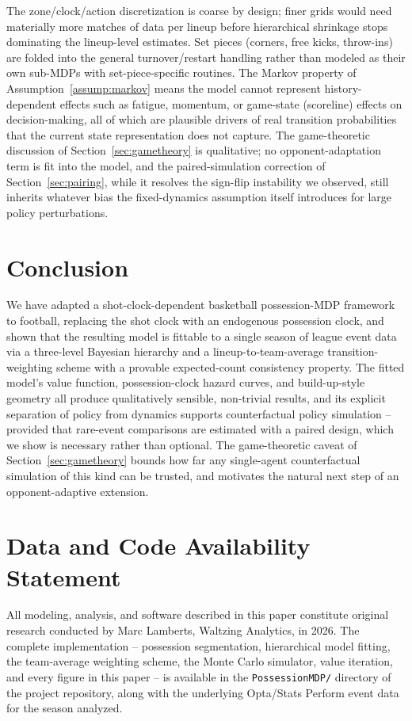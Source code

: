 \documentclass[11pt]{article}
\theoremstyle{plain}
\theoremstyle{definition}
\theoremstyle{remark}
\begin{document}
The zone/clock/action discretization is coarse by design; finer grids would need materially more matches of data per lineup before hierarchical shrinkage stops dominating the lineup-level estimates. Set pieces (corners, free kicks, throw-ins) are folded into the general turnover/restart handling rather than modeled as their own sub-MDPs with set-piece-specific routines. The Markov property of Assumption~\ref{assump:markov} means the model cannot represent history-dependent effects such as fatigue, momentum, or game-state (scoreline) effects on decision-making, all of which are plausible drivers of real transition probabilities that the current state representation does not capture. The game-theoretic discussion of Section~\ref{sec:gametheory} is qualitative; no opponent-adaptation term is fit into the model, and the paired-simulation correction of Section~\ref{sec:pairing}, while it resolves the sign-flip instability we observed, still inherits whatever bias the fixed-dynamics assumption itself introduces for large policy perturbations.

\section{Conclusion}

We have adapted a shot-clock-dependent basketball possession-MDP framework to football, replacing the shot clock with an endogenous possession clock, and shown that the resulting model is fittable to a single season of league event data via a three-level Bayesian hierarchy and a lineup-to-team-average transition-weighting scheme with a provable expected-count consistency property. The fitted model's value function, possession-clock hazard curves, and build-up-style geometry all produce qualitatively sensible, non-trivial results, and its explicit separation of policy from dynamics supports counterfactual policy simulation -- provided that rare-event comparisons are estimated with a paired design, which we show is necessary rather than optional. The game-theoretic caveat of Section~\ref{sec:gametheory} bounds how far any single-agent counterfactual simulation of this kind can be trusted, and motivates the natural next step of an opponent-adaptive extension.

\section*{Data and Code Availability Statement}
All modeling, analysis, and software described in this paper constitute original research conducted by Marc Lamberts, Waltzing Analytics, in 2026. The complete implementation -- possession segmentation, hierarchical model fitting, the team-average weighting scheme, the Monte Carlo simulator, value iteration, and every figure in this paper -- is available in the \texttt{PossessionMDP/} directory of the project repository, along with the underlying Opta/Stats Perform event data for the season analyzed.
\end{document}
